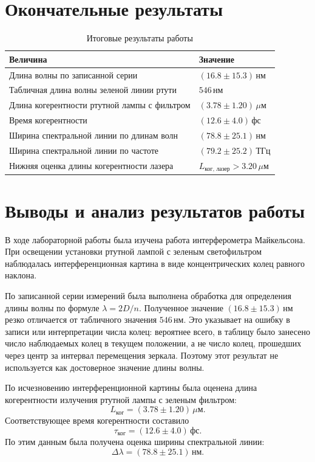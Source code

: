 \documentclass[12pt,a4paper]{article}
\newcommand{\um}{\ensuremath{\,\mu\text{м}}}
\newcommand{\nm}{\ensuremath{\,\text{нм}}}
\newcommand{\THz}{\ensuremath{\,\text{ТГц}}}
\newcommand{\fs}{\ensuremath{\,\text{фс}}}
\begin{document}
\section{Окончательные результаты}

\begin{table}[H]
\centering
\caption{Итоговые результаты работы}
\begin{tabularx}{\textwidth}{>{\raggedright\arraybackslash}X>{\centering\arraybackslash}X}
\toprule
Величина & Значение \\
\midrule
Длина волны по записанной серии & $(16.8 \pm 15.3)\nm$ \\
Табличная длина волны зеленой линии ртути & $546\nm$ \\
Длина когерентности ртутной лампы с фильтром & $(3.78 \pm 1.20)\um$ \\
Время когерентности & $(12.6 \pm 4.0)\fs$ \\
Ширина спектральной линии по длинам волн & $(78.8 \pm 25.1)\nm$ \\
Ширина спектральной линии по частоте & $(79.2 \pm 25.2)\THz$ \\
Нижняя оценка длины когерентности лазера & $L_{\text{ког, лазер}}>3.20\um$ \\
\bottomrule
\end{tabularx}
\end{table}

\section{Выводы и анализ результатов работы}

В ходе лабораторной работы была изучена работа интерферометра Майкельсона. При освещении установки ртутной лампой с зеленым светофильтром наблюдалась интерференционная картина в виде концентрических колец равного наклона.

По записанной серии измерений была выполнена обработка для определения длины волны по формуле $\lambda=2D/n$. Полученное значение $(16.8\pm 15.3)\nm$ резко отличается от табличного значения $546\nm$. Это указывает на ошибку в записи или интерпретации числа колец: вероятнее всего, в таблицу было занесено число наблюдаемых колец в текущем положении, а не число колец, прошедших через центр за интервал перемещения зеркала. Поэтому этот результат не используется как достоверное значение длины волны.

По исчезновению интерференционной картины была оценена длина когерентности излучения ртутной лампы с зеленым фильтром:
\begin{equation}
    L_{\text{ког}}=(3.78\pm 1.20)\um.
\end{equation}
Соответствующее время когерентности составило
\begin{equation}
    \tau_{\text{ког}}=(12.6\pm 4.0)\fs.
\end{equation}
По этим данным была получена оценка ширины спектральной линии:
\begin{equation}
    \Delta\lambda=(78.8\pm 25.1)\nm.
\end{equation}
\end{document}

